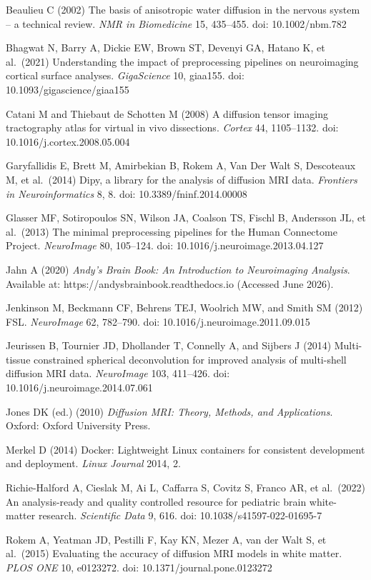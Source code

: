 \documentclass[12pt,a4paper]{article}
\begin{document}
Beaulieu C (2002) The basis of anisotropic water diffusion in the nervous system -- a technical review. \emph{NMR in Biomedicine} 15, 435--455. doi: 10.1002/nbm.782

Bhagwat N, Barry A, Dickie EW, Brown ST, Devenyi GA, Hatano K, et al.~(2021) Understanding the impact of preprocessing pipelines on neuroimaging cortical surface analyses. \emph{GigaScience} 10, giaa155. doi: 10.1093/gigascience/giaa155

Catani M and Thiebaut de Schotten M (2008) A diffusion tensor imaging tractography atlas for virtual in vivo dissections. \emph{Cortex} 44, 1105--1132. doi: 10.1016/j.cortex.2008.05.004

Garyfallidis E, Brett M, Amirbekian B, Rokem A, Van Der Walt S, Descoteaux M, et al.~(2014) Dipy, a library for the analysis of diffusion MRI data. \emph{Frontiers in Neuroinformatics} 8, 8. doi: 10.3389/fninf.2014.00008

Glasser MF, Sotiropoulos SN, Wilson JA, Coalson TS, Fischl B, Andersson JL, et al.~(2013) The minimal preprocessing pipelines for the Human Connectome Project. \emph{NeuroImage} 80, 105--124. doi: 10.1016/j.neuroimage.2013.04.127

Jahn A (2020) \emph{Andy's Brain Book: An Introduction to Neuroimaging Analysis}. Available at: https://andysbrainbook.readthedocs.io (Accessed June 2026).

Jenkinson M, Beckmann CF, Behrens TEJ, Woolrich MW, and Smith SM (2012) FSL. \emph{NeuroImage} 62, 782--790. doi: 10.1016/j.neuroimage.2011.09.015

Jeurissen B, Tournier JD, Dhollander T, Connelly A, and Sijbers J (2014) Multi-tissue constrained spherical deconvolution for improved analysis of multi-shell diffusion MRI data. \emph{NeuroImage} 103, 411--426. doi: 10.1016/j.neuroimage.2014.07.061

Jones DK (ed.) (2010) \emph{Diffusion MRI: Theory, Methods, and Applications}. Oxford: Oxford University Press.

Merkel D (2014) Docker: Lightweight Linux containers for consistent development and deployment. \emph{Linux Journal} 2014, 2.

Richie-Halford A, Cieslak M, Ai L, Caffarra S, Covitz S, Franco AR, et al.~(2022) An analysis-ready and quality controlled resource for pediatric brain white-matter research. \emph{Scientific Data} 9, 616. doi: 10.1038/s41597-022-01695-7

Rokem A, Yeatman JD, Pestilli F, Kay KN, Mezer A, van der Walt S, et al.~(2015) Evaluating the accuracy of diffusion MRI models in white matter. \emph{PLOS ONE} 10, e0123272. doi: 10.1371/journal.pone.0123272
\end{document}
